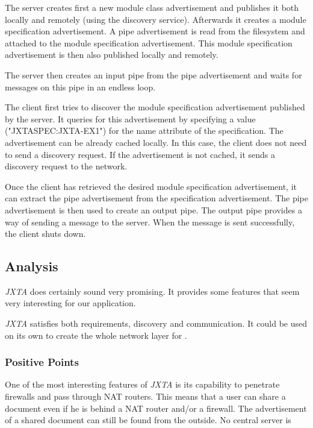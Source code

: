 The server creates first a new module class advertisement and publishes it both locally and remotely (using the discovery service). Afterwards it creates a module specification advertisement. A pipe advertisement is read from the filesystem and attached to the module specification advertisement. This module specification advertisement is then also published locally and remotely.

The server then creates an input pipe from the pipe advertisement and waits for messages on this pipe in an endless loop.

The client first tries to discover the module specification advertisement published by the server. It queries for this advertisement by specifying a value ("JXTASPEC:JXTA-EX1") for the name attribute of the specification. The advertisement can be already cached locally. In this case, the client does not need to send a discovery request. If the advertisement is not cached, it sends a discovery request to the network.

Once the client has retrieved the desired module specification advertisement, it can extract the pipe advertisement from the specification advertisement. The pipe advertisement is then used to create an output pipe. The output pipe provides a way of sending a message to the server. When the message is sent successfully, the client shuts down.



\subsection{Analysis}
\emph{JXTA} does certainly sound very promising. It provides some features that seem very interesting for our application. 

\emph{JXTA} satisfies both requirements, discovery and communication. It could be used on its own to create the whole network layer for \ace.

\subsubsection{Positive Points}
One of the most interesting features of \emph{JXTA} is its capability to penetrate firewalls and pass through NAT routers. This means that a user can share a document even if he is behind a NAT router and/or a firewall. The advertisement of a shared document can still be found from the outside. No central server is required to achieve this. \emph{JXTA} employs so called router and rendezvous peers, some special type of peers, to achieve this characteristic.

